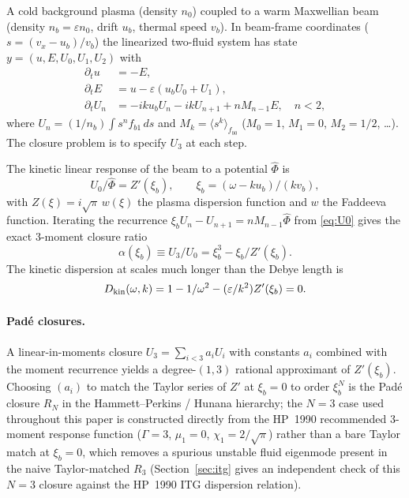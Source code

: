 \documentclass[11pt]{article}
\newcommand{\xib}{\xi_b}
\newcommand{\ub}{u_b}
\newcommand{\vb}{v_b}
\begin{document}
A cold background plasma (density $n_0$) coupled to a warm Maxwellian beam
(density $n_b = \varepsilon n_0$, drift $\ub$, thermal speed $\vb$). In
beam-frame coordinates ($s = (v_x - \ub)/\vb$) the linearized two-fluid
system has state $y = (u, E, U_0, U_1, U_2)$ with
\begin{align}
  \partial_t u            &= -E,\\
  \partial_t E            &= u - \varepsilon (\ub U_0 + U_1),\\
  \partial_t U_n          &= -ik\ub U_n - ik U_{n+1} + n M_{n-1} E,\quad n<2,
\end{align}
where $U_n = (1/n_b)\int s^n f_{b1}\,ds$ and $M_k = \langle
s^k\rangle_{f_{b0}}$ ($M_0=1$, $M_1=0$, $M_2=1/2$, \ldots). The closure
problem is to specify $U_3$ at each step.

The kinetic linear response of the beam to a potential $\hat\Phi$ is
\begin{equation}\label{eq:U0}
  U_0/\hat\Phi = Z'(\xib),\qquad \xib = (\omega - k\ub)/(k\vb),
\end{equation}
with $Z(\xi) = i\sqrt{\pi}\,w(\xi)$ the plasma dispersion function and
$w$ the Faddeeva function. Iterating the recurrence
$\xib U_n - U_{n+1} = n M_{n-1}\hat\Phi$ from \eqref{eq:U0} gives the
exact 3-moment closure ratio
\begin{equation}\label{eq:alpha}
  \alpha(\xib) \equiv U_3/U_0 = \xib^3 - \xib/Z'(\xib).
\end{equation}
The kinetic dispersion at scales much longer than the Debye length is
\begin{equation}\label{eq:Dkin}
  D_{\rm kin}(\omega,k) = 1 - 1/\omega^2 - (\varepsilon/k^2) Z'(\xib) = 0.
\end{equation}

\paragraph{Padé closures.} A linear-in-moments closure $U_3 = \sum_{i<3}
a_i U_i$ with constants $a_i$ combined with the moment recurrence yields a
degree-$(1,3)$ rational approximant of $Z'(\xib)$. Choosing $(a_i)$ to
match the Taylor series of $Z'$ at $\xib=0$ to order $\xib^N$ is the
Pad\'e closure $R_N$ in the Hammett--Perkins / Hunana hierarchy; the $N=3$
case used throughout this paper is constructed directly from the HP~1990
recommended 3-moment response function ($\Gamma=3$, $\mu_1=0$,
$\chi_1=2/\sqrt{\pi}$) rather than a bare Taylor match at $\xib=0$, which
removes a spurious unstable fluid eigenmode present in the naive
Taylor-matched $R_3$ (Section~\ref{sec:itg} gives an independent check of
this $N=3$ closure against the HP~1990 ITG dispersion relation).
\end{document}
